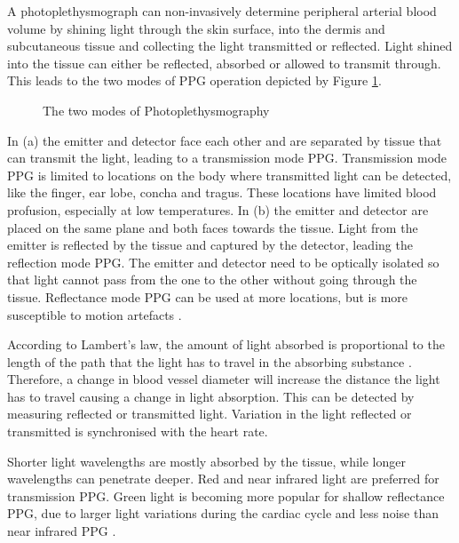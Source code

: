 \medskip
A photoplethysmograph can non-invasively determine peripheral arterial blood volume by shining light through the skin surface, into the dermis and subcutaneous tissue and collecting the light transmitted or reflected. Light shined into the tissue can either be reflected, absorbed or allowed to transmit through. This leads to the two modes of PPG operation depicted by Figure \ref{fig:PPGModes}.

\medskip
 
\begin{figure}[h]
\centering
\graphicspath{{figs/}}

\caption{The two modes of Photoplethysmography \citep{tamura2014wearable}}
\label{fig:PPGModes}
\end{figure}

In (a) the emitter and detector face each other and are separated by tissue that can transmit the light, leading to a transmission mode PPG. Transmission mode PPG is limited to locations on the body where transmitted light can be detected, like the finger, ear lobe, concha and tragus. These locations have limited blood profusion, especially at low temperatures. In (b) the emitter and detector are placed on the same plane and both faces towards the tissue. Light from the emitter is reflected by the tissue and captured by the detector, leading the reflection mode PPG. The emitter and detector need to be optically isolated so that light cannot pass from the one to the other without going through the tissue. Reflectance mode PPG can be used at more locations, but is more susceptible to motion artefacts \citep{tamura2014wearable}.

\medskip
According to Lambert's law, the amount of light absorbed is proportional to the length of the path that the light has to travel in the absorbing substance \citep{lambertANDbeer}. Therefore, a change in blood vessel diameter will increase the distance the light has to travel causing a change in light absorption. This can be detected by measuring reflected or transmitted light. Variation in the light reflected or transmitted is synchronised with the heart rate.

\medskip
Shorter light wavelengths are mostly absorbed by the tissue, while longer wavelengths can penetrate deeper. Red and near infrared light are preferred for transmission PPG. Green light is becoming more popular for shallow reflectance PPG, due to larger light variations during the cardiac cycle and less noise than near infrared PPG \citep{tamura2014wearable}.

